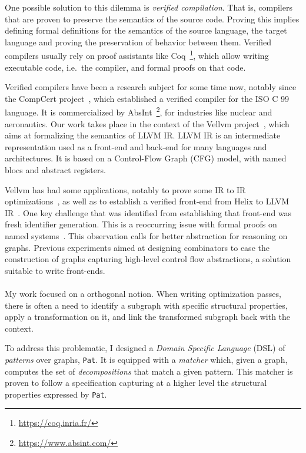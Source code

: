 \documentclass[11pt]{article}
\newcommand{\pat}{\texttt{Pat}\xspace}
\begin{document}
One possible solution to this dilemma is \emph{verified compilation}. That is, compilers that are proven to preserve the semantics of the source code. Proving this implies defining formal definitions for the semantics of the source language, the target language and proving the preservation of behavior between them. Verified compilers usually rely on proof assistants like Coq~\footnote{\url{https://coq.inria.fr/}}, which allow writing executable code, i.e.\ the compiler, and formal proofs on that code.

Verified compilers have been a research subject for some time now, notably since the CompCert project~\cite{CompCert}, which established a verified compiler for the ISO C 99 language. It is commercialized by AbsInt~\footnote{\url{https://www.absint.com/}}, for industries like nuclear and aeronautics. Our work takes place in the context of the Vellvm project~\cite{Vellvm}, which aims at formalizing the semantics of LLVM IR\@. LLVM IR is an intermediate representation used as a front-end and back-end for many languages and architectures. It is based on a Control-Flow Graph (CFG) model, with named blocs and abstract registers.

Vellvm has had some applications, notably to prove some IR to IR optimizations~\cite{Vellvm}, as well as to establish a verified front-end from Helix to LLVM IR~\cite{Helix}. One key challenge that was identified from establishing that front-end was fresh identifier generation. This is a reoccurring issue with formal proofs on named systems~\cite{Bastien}. This observation calls for better abstraction for reasoning on graphs. Previous experiments aimed at designing combinators to ease the construction of graphs capturing high-level control flow abstractions, a solution suitable to write front-ends.

\paragraph{}
My work focused on a orthogonal notion. When writing optimization passes, there is often a need to identify a subgraph with specific structural properties, apply a transformation on it, and link the transformed subgraph back with the context.

To address this problematic, I designed a \emph{Domain Specific Language} (DSL) of \emph{patterns} over graphs, \pat{}. It is equipped with a \emph{matcher} which, given a graph, computes the set of \emph{decompositions} that match a given pattern. This matcher is proven to follow a specification capturing at a higher level the structural properties expressed by \pat{}.
\end{document}
